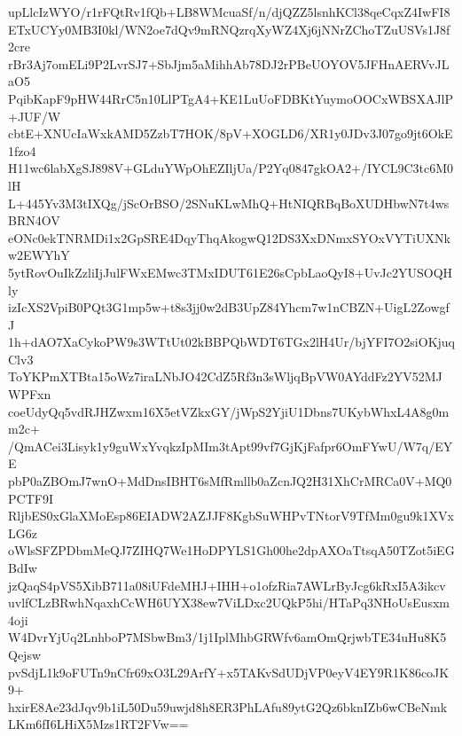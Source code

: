 upLlcIzWYO/r1rFQtRv1fQb+LB8WMcuaSf/n/djQZZ5lsnhKCl38qeCqxZ4IwFI8
ETxUCYy0MB3I0kl/WN2oe7dQv9mRNQzrqXyWZ4Xj6jNNrZChoTZuUSVs1J8f2cre
rBr3Aj7omELi9P2LvrSJ7+SbJjm5aMihhAb78DJ2rPBeUOYOV5JFHnAERVvJLaO5
PqibKapF9pHW44RrC5n10LlPTgA4+KE1LuUoFDBKtYuymoOOCxWBSXAJlP+JUF/W
cbtE+XNUcIaWxkAMD5ZzbT7HOK/8pV+XOGLD6/XR1y0JDv3J07go9jt6OkE1fzo4
H11wc6labXgSJ898V+GLduYWpOhEZIljUa/P2Yq0847gkOA2+/IYCL9C3tc6M0lH
L+445Yv3M3tIXQg/jScOrBSO/2SNuKLwMhQ+HtNIQRBqBoXUDHbwN7t4wsBRN4OV
eONc0ekTNRMDi1x2GpSRE4DqyThqAkogwQ12DS3XxDNmxSYOxVYTiUXNkw2EWYhY
5ytRovOuIkZzliIjJulFWxEMwc3TMxIDUT61E26sCpbLaoQyI8+UvJc2YUSOQHly
izIcXS2VpiB0PQt3G1mp5w+t8s3jj0w2dB3UpZ84Yhcm7w1nCBZN+UigL2ZowgfJ
1h+dAO7XaCykoPW9s3WTtUt02kBBPQbWDT6TGx2lH4Ur/bjYFI7O2siOKjuqClv3
ToYKPmXTBta15oWz7iraLNbJO42CdZ5Rf3n3sWljqBpVW0AYddFz2YV52MJWPFxn
coeUdyQq5vdRJHZwxm16X5etVZkxGY/jWpS2YjiU1Dbns7UKybWhxL4A8g0mm2c+
/QmACei3Lisyk1y9guWxYvqkzIpMIm3tApt99vf7GjKjFafpr6OmFYwU/W7q/EYE
pbP0aZBOmJ7wnO+MdDnsIBHT6sMfRmllb0aZcnJQ2H31XhCrMRCa0V+MQ0PCTF9I
RljbES0xGlaXMoEsp86EIADW2AZJJF8KgbSuWHPvTNtorV9TfMm0gu9k1XVxLG6z
oWlsSFZPDbmMeQJ7ZIHQ7We1HoDPYLS1Gh00he2dpAXOaTtsqA50TZot5iEGBdIw
jzQaqS4pVS5XibB711a08iUFdeMHJ+IHH+o1ofzRia7AWLrByJcg6kRxI5A3ikcv
uvlfCLzBRwhNqaxhCcWH6UYX38ew7ViLDxc2UQkP5hi/HTaPq3NHoUsEusxm4oji
W4DvrYjUq2LnhboP7MSbwBm3/1j1IplMhbGRWfv6amOmQrjwbTE34uHu8K5Qejsw
pvSdjL1k9oFUTn9nCfr69xO3L29ArfY+x5TAKvSdUDjVP0eyV4EY9R1K86coJK9+
hxirE8Ae23dJqv9b1iL50Du59uwjd8h8ER3PhLAfu89ytG2Qz6bknIZb6wCBeNmk
LKm6fI6LHiX5Mzs1RT2FVw==
